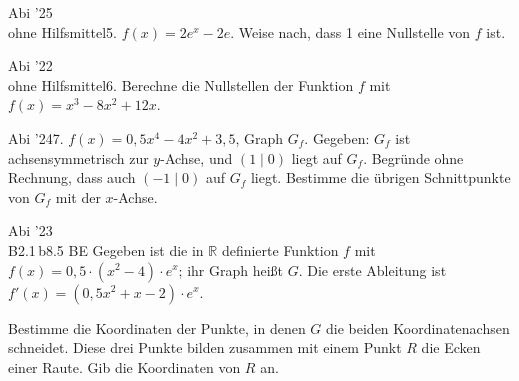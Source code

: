 \documentclass[11pt]{article}
\begin{document}
\pfgruppe{}
\begin{pfaufg}{Abi ’25\\ohne Hilfsmittel}{5.}{}
$f(x) = 2e^x - 2e$. Weise nach, dass 1 eine Nullstelle von $f$ ist.
\par\smallskip\noindent{}
\end{pfaufg}
\begin{pfaufg}{Abi ’22\\ohne Hilfsmittel}{6.}{}
Berechne die Nullstellen der Funktion $f$ mit $f(x) = x^3 - 8x^2 + 12x$.
\end{pfaufg}
\begin{pfaufg}{Abi ’24}{7.}{}
$f(x) = 0{,}5x^4 - 4x^2 + 3{,}5$, Graph $G_f$. Gegeben: $G_f$ ist achsensymmetrisch zur $y$-Achse, und $(1 \mid 0)$ liegt auf $G_f$. Begründe ohne Rechnung, dass auch $(-1 \mid 0)$ auf $G_f$ liegt. Bestimme die übrigen Schnittpunkte von $G_f$ mit der $x$-Achse.
\end{pfaufg}

\begin{pfaufg}{Abi ’23\\B2.1\,b}{8.}{5 BE}
Gegeben ist die in $\mathbb{R}$ definierte Funktion $f$ mit $f(x) = 0{,}5\cdot(x^2 - 4)\cdot e^x$; ihr Graph heißt $G$. Die erste Ableitung ist $f'(x) = (0{,}5x^2 + x - 2)\cdot e^x$.
\par\smallskip
Bestimme die Koordinaten der Punkte, in denen $G$ die beiden Koordinatenachsen schneidet. Diese drei Punkte bilden zusammen mit einem Punkt $R$ die Ecken einer Raute. Gib die Koordinaten von $R$ an.
\end{pfaufg}
\end{document}
